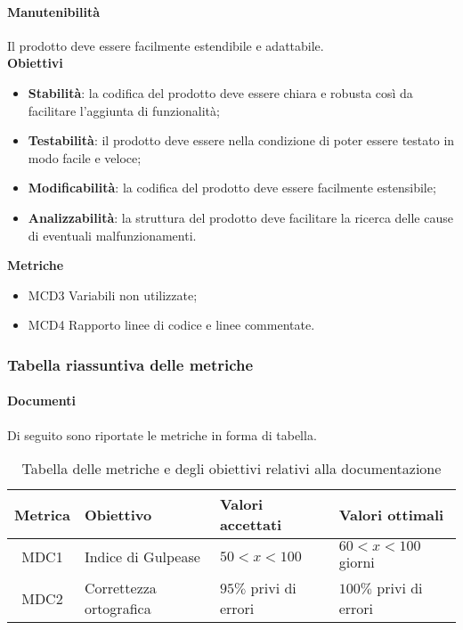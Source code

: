 \paragraph{Manutenibilità}

Il prodotto deve essere facilmente estendibile e adattabile. \\

\textbf{Obiettivi}
\begin{itemize}
\item \textbf{Stabilità}: la codifica del prodotto deve essere chiara e robusta così da facilitare l'aggiunta di funzionalità;
\item \textbf{Testabilità}: il prodotto deve essere nella condizione di poter essere testato in modo facile e veloce;
\item \textbf{Modificabilità}: la codifica del prodotto deve essere facilmente estensibile;
\item \textbf{Analizzabilità}: la struttura del prodotto deve facilitare la ricerca delle cause di eventuali malfunzionamenti.
\end{itemize}

\textbf{Metriche}
\begin{itemize}
\item MCD3 Variabili non utilizzate;
\item MCD4 Rapporto linee di codice e linee commentate.
\end{itemize}

\subsubsection{Tabella riassuntiva delle metriche}
\paragraph{Documenti}
Di seguito sono riportate le metriche in forma di tabella.
\begin{table}[H]
		\begin{center}
			\setlength{\aboverulesep}{0pt}
			\setlength{\belowrulesep}{0pt}
			\setlength{\extrarowheight}{.75ex}
			\begin{tabular}{ c C{6cm} C{3cm} C{3cm} }
				\textbf{Metrica} & \textbf{Obiettivo} & \textbf{Valori accettati} & \textbf{Valori ottimali}  \\
				\toprule
				MDC1 & Indice di Gulpease & $ 50 < x < 100$ & $60 < x < 100$ giorni \\
				MDC2 & Correttezza ortografica & $ 95 \%$ privi di errori & $ 100\%$ privi di errori \\
				\bottomrule
			\end{tabular}
			\caption{Tabella delle metriche e degli obiettivi relativi alla documentazione}
		\end{center}
	\end{table}
	
